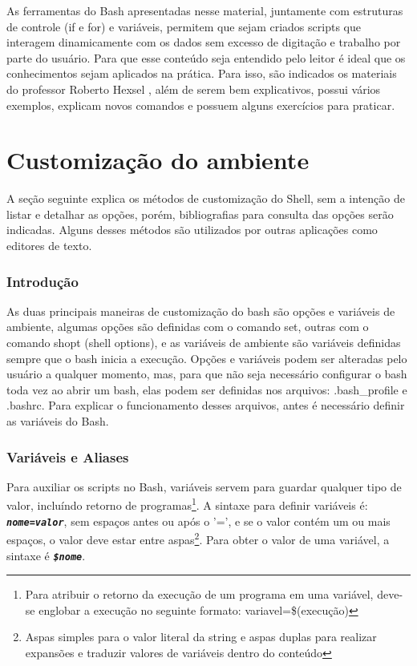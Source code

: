 \documentclass[oneside, 11 pt]{article}
\begin{document}
	As ferramentas do Bash apresentadas nesse material, juntamente com estruturas de controle
	(if e for) e variáveis, permitem que sejam criados scripts que interagem dinamicamente com
	os dados sem excesso de digitação e trabalho por parte do usuário. Para que esse conteúdo
	seja entendido pelo leitor é ideal que os conhecimentos sejam aplicados na prática. Para isso,
	são indicados os materiais do professor Roberto Hexsel \cite{roberto1, roberto2}, além
	de serem bem explicativos, possui vários exemplos, explicam novos comandos e possuem
	alguns exercícios para praticar.
	
	\newpage
	\part{Customização do ambiente}
	
	A seção seguinte explica os métodos de customização do Shell, sem a intenção de listar e detalhar as opções, porém, bibliografias para consulta das opções serão indicadas. Alguns desses métodos são utilizados por outras aplicações como editores de texto.
	
	\section{Introdução}
	As duas principais maneiras de customização do bash são opções e variáveis de ambiente, algumas opções são definidas com o comando set, outras com o comando shopt (shell options), e as variáveis de ambiente são variáveis definidas sempre que o bash inicia a execução. Opções e variáveis podem ser alteradas pelo usuário a qualquer momento, mas, para que não seja necessário configurar o bash toda vez ao abrir um bash, elas podem ser definidas nos arquivos: .bash\_profile e .bashrc. Para explicar o funcionamento desses arquivos, antes é necessário definir as variáveis do Bash.
	
	\section{Variáveis e Aliases}
	Para auxiliar os scripts no Bash, variáveis servem para guardar qualquer tipo de valor, incluíndo retorno de programas\footnote[1]{Para atribuir o retorno da execução de um programa em uma variável, deve-se englobar a execução no seguinte formato: variavel=\$(execução)}. A sintaxe para definir variáveis é: \texttt{\textbf{\textit{nome=valor}}}, sem espaços antes ou após o '=', e se o valor contém um ou mais espaços, o valor deve estar entre aspas\footnote[2]{Aspas simples para o valor literal da string e aspas duplas para realizar expansões e traduzir valores de variáveis dentro do conteúdo}. Para obter o valor de uma variável, a sintaxe é \texttt{\textbf{\textit{\$nome}}}.
	
\end{document}
